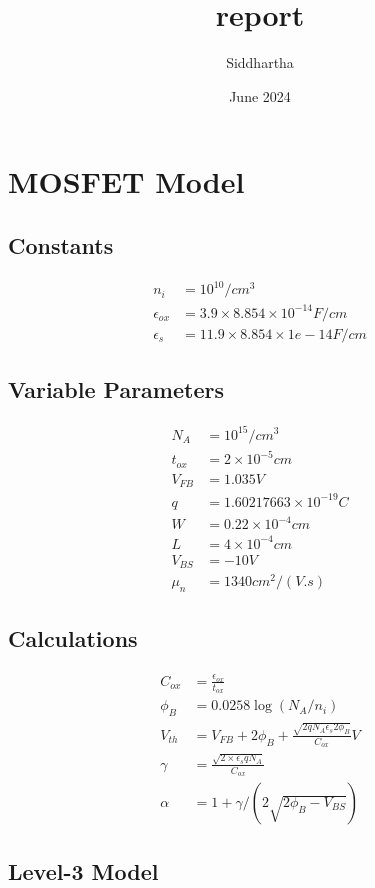 \documentclass{article}
\title{report}
\author{Siddhartha }
\date{June 2024}
\begin{document}
\maketitle

\section{MOSFET Model}
\subsection{Constants}
\begin{align}    
    n_i &= 10^{10}/cm^3 \\
    \epsilon_{ox} &= 3.9\times8.854\times10^{-14} F/cm  \\
    \epsilon_s &= 11.9\times8.854\times1e-14 F/cm  
\end{align}

\subsection{Variable Parameters}
\begin{align}
    N_A &= 10^{15} /cm^{3} \\
    t_{ox} &= 2\times10^{-5} cm \\
    V_{FB} &= 1.035  V \\
    q &= 1.60217663 \times 10^{-19}  C \\
    W &= 0.22 \times 10^{-4} cm \\
    L &= 4  \times 10^{-4}  cm \\
    V_{BS} &= -10 V \\
    \mu_n  &= 1340 cm^2/(V.s) 
\end{align}
\subsection{Calculations}
\begin{align}
    C_{ox} &= \frac{\epsilon_{ox}}{t_{ox}} \\
    \phi_B &= 0.0258\log(N_A/n_i)\\
    V_{th} &= V_{FB} + 2 \phi_{B} + \frac{\sqrt{2q N_A \epsilon_s 2 \phi_B}}{C_{ox}}  V  \\
    \gamma &= \frac{\sqrt{2\times\epsilon_s q N_A}}{C_{ox}} \\
    \alpha &= 1 + \gamma/(2\sqrt{2\phi_B-V_{BS}}) 
\end{align}
\subsection{Level-3 Model}
\end{document}
